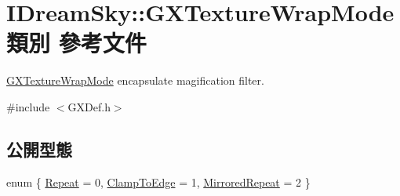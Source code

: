 \hypertarget{class_i_dream_sky_1_1_g_x_texture_wrap_mode}{}\section{I\+Dream\+Sky\+:\+:G\+X\+Texture\+Wrap\+Mode 類別 參考文件}
\label{class_i_dream_sky_1_1_g_x_texture_wrap_mode}


\hyperlink{class_i_dream_sky_1_1_g_x_texture_wrap_mode}{G\+X\+Texture\+Wrap\+Mode} encapsulate magification filter.  




{\ttfamily \#include $<$G\+X\+Def.\+h$>$}

\subsection*{公開型態}
\begin{DoxyCompactItemize}
\item 
enum \{ \hyperlink{class_i_dream_sky_1_1_g_x_texture_wrap_mode_a3e0b62471e1d9e8dddfa47915a73a0eda570004299b6ae04ecbabb3d53f50d438}{Repeat} = 0, 
\hyperlink{class_i_dream_sky_1_1_g_x_texture_wrap_mode_a3e0b62471e1d9e8dddfa47915a73a0edafb3f2ae67c836f34a5e496afe9eddecd}{Clamp\+To\+Edge} = 1, 
\hyperlink{class_i_dream_sky_1_1_g_x_texture_wrap_mode_a3e0b62471e1d9e8dddfa47915a73a0eda95c43d0ea77aac62973397dca4dfb853}{Mirrored\+Repeat} = 2
 \}
\end{DoxyCompactItemize}
